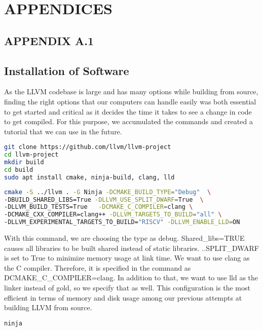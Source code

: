 \chapter{APPENDICES}
\section*{APPENDIX A.1}
\renewcommand{\theequation}{A.1.\arabic{equation}}
\setcounter{equation}{0}
\section{Installation of Software}

As the LLVM codebase is large and has many options while building from source, finding the right options that our computers can handle easily was both essential to get started and critical as it decides the time it takes to see a change in code to get compiled. For this purpose, we accumulated the commands and created a tutorial that we can use in the future.

\begin{lstlisting}[language=Bash, caption={Clone Repository and Install Necessary Packages}]
git clone https://github.com/llvm/llvm-project
cd llvm-project
mkdir build
cd build	
sudo apt install cmake, ninja-build, clang, lld	
\end{lstlisting}

\begin{lstlisting}[language=Bash, caption={CMake Configuration We Used}]
cmake -S ../llvm . -G Ninja -DCMAKE_BUILD_TYPE="Debug"  \
-DBUILD_SHARED_LIBS=True -DLLVM_USE_SPLIT_DWARF=True  \
-DLLVM_BUILD_TESTS=True   -DCMAKE_C_COMPILER=clang \
-DCMAKE_CXX_COMPILER=clang++ -DLLVM_TARGETS_TO_BUILD="all" \
-DLLVM_EXPERIMENTAL_TARGETS_TO_BUILD="RISCV" -DLLVM_ENABLE_LLD=ON	
\end{lstlisting}
With this command, we are choosing the type as debug. Shared\_libs=TRUE causes all libraries to be built shared instead of static libraries. ..SPLIT\_DWARF is set to True to minimize memory usage at link time. We want to use clang as the C compiler. Therefore, it is specified in the command as DCMAKE\_C\_COMPILER=clang. In addition to that, we want to use lld as the linker instead of gold, so we specify that as well.
This configuration is the most efficient in terms of memory and disk usage among our previous attempts at building LLVM from source.
\noindent
\begin{minipage}[t]{\linewidth}
\begin{lstlisting}[language=Bash, caption={To build from scratch or to rebuild files with change, automatically}]
ninja
\end{lstlisting}
\end{minipage}

